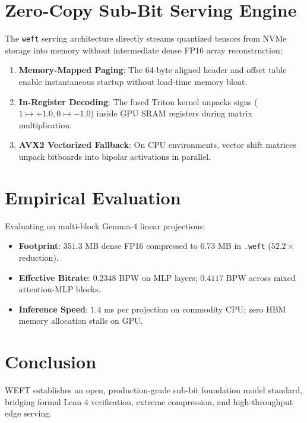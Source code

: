 \documentclass[11pt,a4paper]{article}
\begin{document}
\section{Zero-Copy Sub-Bit Serving Engine}
The \texttt{weft} serving architecture directly streams quantized tensors from NVMe storage into memory without intermediate dense FP16 array reconstruction:
\begin{enumerate}
    \item \textbf{Memory-Mapped Paging}: The 64-byte aligned header and offset table enable instantaneous startup without load-time memory bloat.
    \item \textbf{In-Register Decoding}: The fused Triton kernel unpacks signs ($1 \mapsto +1.0, 0 \mapsto -1.0$) inside GPU SRAM registers during matrix multiplication.
    \item \textbf{AVX2 Vectorized Fallback}: On CPU environments, vector shift matrices unpack bitboards into bipolar activations in parallel.
\end{enumerate}

\section{Empirical Evaluation}
Evaluating on multi-block Gemma-4 linear projections:
\begin{itemize}
    \item \textbf{Footprint}: $351.3$ MB dense FP16 compressed to $6.73$ MB in \texttt{.weft} ($52.2\times$ reduction).
    \item \textbf{Effective Bitrate}: $0.2348$ BPW on MLP layers; $0.4117$ BPW across mixed attention-MLP blocks.
    \item \textbf{Inference Speed}: $1.4$ ms per projection on commodity CPU; zero HBM memory allocation stalls on GPU.
\end{itemize}

\section{Conclusion}
WEFT establishes an open, production-grade sub-bit foundation model standard, bridging formal Lean 4 verification, extreme compression, and high-throughput edge serving.
\end{document}

